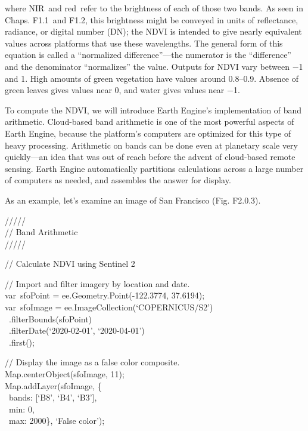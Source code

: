 \documentclass[
  letterpaper,
  DIV=11,
  numbers=noendperiod]{scrreprt}
\begin{document}
where NIR~and red~refer to the brightness of each of those two bands. As
seen in Chaps. F1.1~and F1.2, this brightness might be conveyed in units
of reflectance, radiance, or digital number (DN); the NDVI is intended
to give nearly equivalent values across platforms that use these
wavelengths. The general form of this equation is called a ``normalized
difference''---the numerator is the ``difference'' and the denominator
``normalizes'' the value. Outputs for NDVI vary between −1 and 1. High
amounts of green vegetation have values around 0.8--0.9. Absence of
green leaves gives values near 0, and water gives values near −1.

To compute the NDVI, we will introduce Earth Engine's implementation of
band arithmetic. Cloud-based band arithmetic is one of the most powerful
aspects of Earth Engine, because the platform's computers are optimized
for this type of heavy processing. Arithmetic on bands can be done even
at planetary scale very quickly---an idea that was out of reach before
the advent of cloud-based remote sensing. Earth Engine automatically
partitions calculations across a large number of computers as needed,
and assembles the answer for display.

As an example, let's examine an image of San Francisco
(\hspace{0pt}\hspace{0pt}Fig. F2.0.3).

/////\\
// Band Arithmetic\\
/////

// Calculate NDVI using Sentinel 2

// Import and filter imagery by location and date.\\
var~sfoPoint = ee.Geometry.Point(-122.3774, 37.6194);\\
var~sfoImage = ee.ImageCollection(`COPERNICUS/S2')\\
\hspace*{0.333em} ~.filterBounds(sfoPoint)\\
\hspace*{0.333em} ~.filterDate(`2020-02-01', `2020-04-01')\\
\hspace*{0.333em} ~.first();

// Display the image as a false color composite.\\
Map.centerObject(sfoImage, 11);\\
Map.addLayer(sfoImage, \{\\
\hspace*{0.333em} ~bands: {[}`B8', `B4', `B3'{]},\\
\hspace*{0.333em} ~min: 0,\\
\hspace*{0.333em} ~max: 2000\}, `False color');
\end{document}
